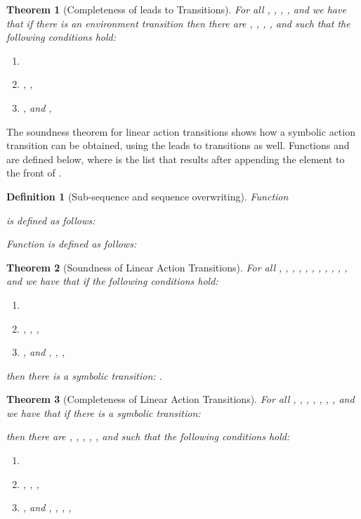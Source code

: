 \documentclass[submission,copyright,creativecommons,sharealike]{eptcs}
\newtheorem{definition}{Definition}
\newtheorem{theorem}{Theorem}
\begin{document}
\begin{theorem}[Completeness of leads to Transitions]
  For all , , , , and  we have that if there is an
  environment transition 
  then there are , , , , and  such that the
  following conditions hold:
  \begin{enumerate}
  \item 
  \item , , 
  \item  , and ,  
  \end{enumerate}
\end{theorem}



The soundness theorem for linear action transitions shows how a
symbolic action transition can be obtained, using the leads to
transitions as well. Functions  and  are
defined below, where  is
the list that results after appending the element  to the front of .

\begin{definition}[Sub-sequence and sequence overwriting] Function
  
  is defined as follows:
  
Function  is defined as follows:
  
\end{definition}

\begin{theorem}[Soundness of Linear Action Transitions]\label{theo:soundness-lits}
  For all , , , , , , , ,
  , , ,
  and  we have that if the following conditions hold:
  \begin{enumerate}
  \item 
  \item , , , 
  \item , and , , , 
 \end{enumerate}
 then there is a symbolic transition: .
\end{theorem}



\begin{theorem}[Completeness of Linear Action Transitions]
  For all , , , , , , , and  we have that if
  there is a symbolic transition:
  
  then there are , , , , , and 
  such that the following conditions hold:
  \begin{enumerate}
  \item 
  \item , , , 
  \item , and , , , , 
  \end{enumerate}
\end{theorem}
\end{document}

